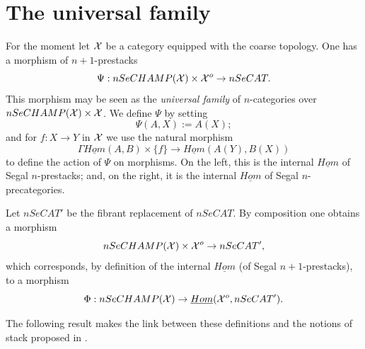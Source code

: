 %

\clearpage
\section{The universal family}
\label{universellepage}

For the moment let ${\cal X}$ be a category equipped with the coarse topology.
One has a morphism of $n+1$-prestacks
$$
\Psi : nSeCHAMP({\cal X} ) \times {\cal X} ^o \rightarrow nSeCAT.
$$
This morphism may be seen as the \emph{universal family} of $n$-categories
over $nSeCHAMP({\cal X} ) \times {\cal X}$. We define $\Psi$ by setting
$$
\Psi (A,X):= A(X);
$$
and for $f:X\rightarrow Y$ in ${\cal X} $ we use the natural morphism
$$
\Gamma \underline{Hom}(A,B) \times \{ f\} \rightarrow \underline{Hom}(A(Y),
B(X))
$$
to define the action of $\Psi$ on morphisms. On the left, this is the
internal $\underline{Hom}$ of Segal $n$-prestacks; and, on the right, it is
the internal $\underline{Hom}$ of Segal $n$-precategories.

Let $nSeCAT'$ be the fibrant replacement of $nSeCAT$. By composition one
obtains a morphism
$$
nSeCHAMP({\cal X} ) \times {\cal X} ^o\rightarrow nSeCAT',
$$
which corresponds, by definition of the internal $\underline{Hom}$ (of Segal
$n+1$-prestacks), to a morphism
$$
\Phi : nSeCHAMP({\cal X} ) \rightarrow \underline{Hom}({\cal X} ^o, nSeCAT').
$$

The following result makes the link between these definitions and the notions
of stack proposed in \cite{limits}.


